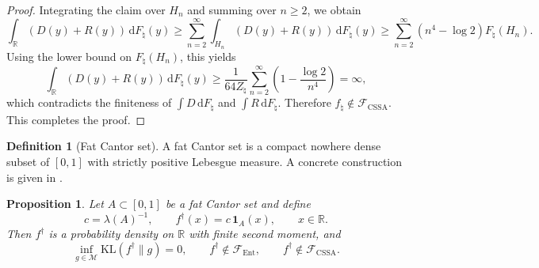 \documentclass[11pt]{article}
\newtheorem{proposition}[theorem]{Proposition}
\theoremstyle{definition}
\newtheorem{definition}[theorem]{Definition}
\begin{document}
\begin{proof}
Integrating the claim over $H_n$ and summing over $n\ge2$, we obtain
\[
\int_{\mathbb{R}} (D(y)+R(y))\,\mathrm{d}F_\natural(y)
\ge \sum_{n=2}^{\infty}\int_{H_n}(D(y)+R(y))\,\mathrm{d}F_\natural(y)
\ge \sum_{n=2}^{\infty}(n^4-\log 2)F_\natural(H_n).
\]
Using the lower bound on $F_\natural(H_n)$, this yields
\[
\int_{\mathbb{R}} (D(y)+R(y))\,\mathrm{d}F_\natural(y)
\ge \frac{1}{64Z_\natural}\sum_{n=2}^{\infty}\left(1-\frac{\log 2}{n^4}\right)=\infty,
\]
which contradicts the finiteness of $\int D\,\mathrm{d}F_\natural$ and $\int R\,\mathrm{d}F_\natural$. Therefore $f_\natural\notin\mathcal F_{\mathrm{CSSA}}$. 
This completes the proof.
\end{proof}

\begin{definition}[Fat Cantor set]
\label{def:fatcantor}
A fat Cantor set is a compact nowhere dense subset of $[0,1]$ with strictly positive Lebesgue measure. A concrete construction is given in \citet[Chapter~8, pp.~87--88]{GelbaumOlmsted1964}.
\end{definition}

\begin{proposition}
\label{prop:routes-not-exhaustive}
Let $A\subset[0,1]$ be a fat Cantor set and define
\[
c=\lambda(A)^{-1},
\qquad
f^{\dagger}(x)=c\,\mathbf{1}_A(x),
\qquad x\in\mathbb{R}.
\]
Then $f^{\dagger}$ is a probability density on $\mathbb{R}$ with finite second moment, and
\[
\inf_{g\in\mathcal M}\mathrm{KL}(f^{\dagger}\|g)=0,
\qquad
f^{\dagger}\notin\mathcal F_{\mathrm{Ent}},
\qquad
f^{\dagger}\notin\mathcal F_{\mathrm{CSSA}}.
\]
\end{proposition}
\end{document}
